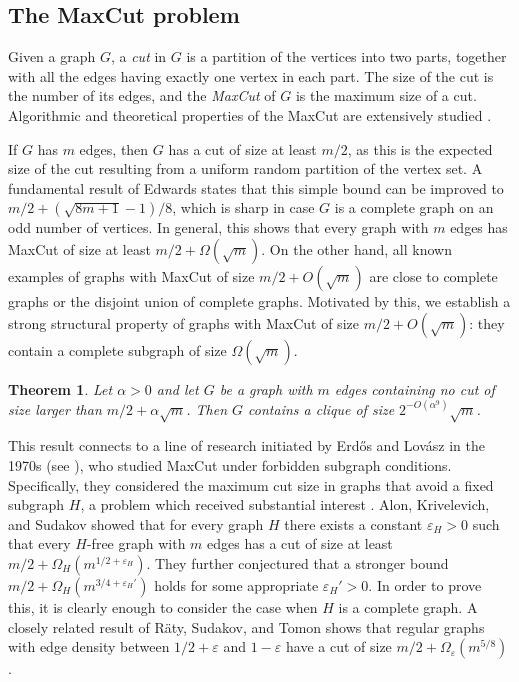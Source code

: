 \documentclass[11pt]{amsart}
\theoremstyle{plain}
\newtheorem{theorem}{Theorem}[section]
\newtheorem*{question*}{Question}
\theoremstyle{definition}
\begin{document}
\subsection{The MaxCut problem} Given a graph $G$, a \emph{cut} in $G$ is a partition of the vertices into two parts, together with all the edges having exactly one vertex in each part. The size of the cut is the number of its edges, and the \emph{MaxCut} of $G$ is the maximum size of a cut. Algorithmic and theoretical properties of the MaxCut are extensively studied \cite{AKS,BJS,Edwards,Edwards2,erdos_MaxCut,GoemansWilliamson}.

If $G$ has $m$ edges, then $G$ has a cut of size at least $m/2$, as this is the expected size of the cut resulting from a uniform random partition of the vertex set. A fundamental result of Edwards \cite{Edwards,Edwards2} states that this simple bound can be improved to $m/2+(\sqrt{8m+1}-1)/8$, which is sharp in case $G$ is a complete graph on an odd number of vertices. In general, this shows that every graph with $m$ edges has MaxCut of size at least $m/2+\Omega(\sqrt{m})$. On the other hand, all known examples of graphs with MaxCut of size $m/2+O(\sqrt{m})$ are close to complete graphs or the disjoint union of complete graphs. Motivated by this, we establish a strong structural property of graphs with MaxCut of size $m/2+O(\sqrt{m})$: they contain a complete subgraph of size $\Omega(\sqrt{m})$.

\begin{theorem}\label{thm:main_MaxCut}
    Let $\alpha>0$ and let $G$ be a graph with $m$ edges containing no cut of size larger than $m/2+\alpha\sqrt{m}$. Then $G$ contains a clique of size $2^{-O(\alpha^9)}\sqrt{m}$.
\end{theorem}



This result connects to a line of research initiated by Erd\H{o}s and Lov\'asz in the 1970s (see \cite{erdos_MaxCut}), who studied MaxCut under forbidden subgraph conditions. Specifically, they considered the maximum cut size in graphs that avoid a fixed subgraph $H$, a problem which received substantial interest \cite{Alon_MaxCut,AKS,BJS,GJS}. Alon, Krivelevich, and Sudakov \cite{AKS} showed that for every graph $H$ there exists a constant $\varepsilon_H>0$ such that every $H$-free graph with $m$ edges has a cut of size at least $m/2+\Omega_H(m^{1/2+\varepsilon_H})$. They further conjectured that a stronger bound $m/2+\Omega_H(m^{3/4+\varepsilon_H'})$ holds for some appropriate $\varepsilon_H'>0$. In order to prove this, it is clearly enough to consider the case when $H$ is a complete graph. A closely related result of R\"aty, Sudakov, and Tomon \cite{RST} shows that regular graphs with edge density between $1/2+\varepsilon$ and $1-\varepsilon$ have a cut of size $m/2+\Omega_{\varepsilon}(m^{5/8})$.
\end{document}

